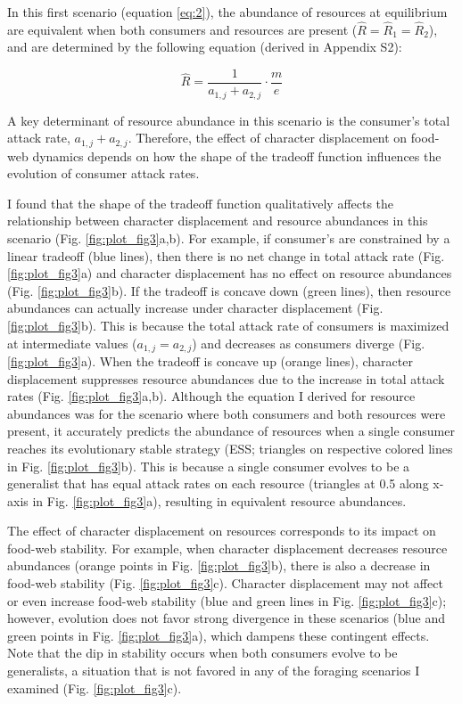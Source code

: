 \documentclass[11pt,]{article}
\begin{document}
In this first scenario (equation \ref{eq:2}), the abundance of resources
at equilibrium are equivalent when both consumers and resources are
present (\(\hat R = \hat R_1 = \hat R_2\)), and are determined by the
following equation (derived in Appendix S2):

\begin{equation} \label{eq:5}
  \hat{R}=\frac{1}{a_{1,j}+a_{2,j}}\cdot\frac{m}{e}
\end{equation}

A key determinant of resource abundance in this scenario is the
consumer's total attack rate, \(a_{1,j}+a_{2,j}\). Therefore, the effect
of character displacement on food-web dynamics depends on how the shape
of the tradeoff function influences the evolution of consumer attack
rates.

I found that the shape of the tradeoff function qualitatively affects
the relationship between character displacement and resource abundances
in this scenario (Fig. \ref{fig:plot_fig3}a,b). For example, if
consumer's are constrained by a linear tradeoff (blue lines), then there
is no net change in total attack rate (Fig. \ref{fig:plot_fig3}a) and
character displacement has no effect on resource abundances (Fig.
\ref{fig:plot_fig3}b). If the tradeoff is concave down (green lines),
then resource abundances can actually increase under character
displacement (Fig. \ref{fig:plot_fig3}b). This is because the total
attack rate of consumers is maximized at intermediate values
(\(a_{1,j}=a_{2,j}\)) and decreases as consumers diverge (Fig.
\ref{fig:plot_fig3}a). When the tradeoff is concave up (orange lines),
character displacement suppresses resource abundances due to the
increase in total attack rates (Fig. \ref{fig:plot_fig3}a,b). Although
the equation I derived for resource abundances was for the scenario
where both consumers and both resources were present, it accurately
predicts the abundance of resources when a single consumer reaches its
evolutionary stable strategy (ESS; triangles on respective colored lines
in Fig. \ref{fig:plot_fig3}b). This is because a single consumer evolves
to be a generalist that has equal attack rates on each resource
(triangles at 0.5 along x-axis in Fig. \ref{fig:plot_fig3}a), resulting
in equivalent resource abundances.

The effect of character displacement on resources corresponds to its
impact on food-web stability. For example, when character displacement
decreases resource abundances (orange points in Fig.
\ref{fig:plot_fig3}b), there is also a decrease in food-web stability
(Fig. \ref{fig:plot_fig3}c). Character displacement may not affect or
even increase food-web stability (blue and green lines in Fig.
\ref{fig:plot_fig3}c); however, evolution does not favor strong
divergence in these scenarios (blue and green points in Fig.
\ref{fig:plot_fig3}a), which dampens these contingent effects. Note that
the dip in stability occurs when both consumers evolve to be
generalists, a situation that is not favored in any of the foraging
scenarios I examined (Fig. \ref{fig:plot_fig3}c).
\end{document}
